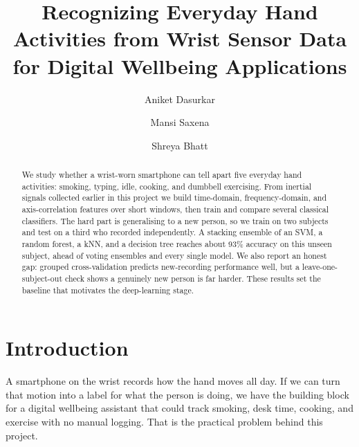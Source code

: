 \documentclass[runningheads]{llncs}
\begin{document}
\title{Recognizing Everyday Hand Activities from Wrist Sensor Data for Digital Wellbeing Applications}


\author{Aniket Dasurkar \and Mansi Saxena \and Shreya Bhatt}

\maketitle

\begin{abstract}
We study whether a wrist-worn smartphone can tell apart five everyday hand activities: smoking, typing, idle, cooking, and dumbbell exercising. From inertial signals collected earlier in this project we build time-domain, frequency-domain, and axis-correlation features over short windows, then train and compare several classical classifiers. The hard part is generalising to a new person, so we train on two subjects and test on a third who recorded independently. A stacking ensemble of an SVM, a random forest, a kNN, and a decision tree reaches about 93\% accuracy on this unseen subject, ahead of voting ensembles and every single model. We also report an honest gap: grouped cross-validation predicts new-recording performance well, but a leave-one-subject-out check shows a genuinely new person is far harder. These results set the baseline that motivates the deep-learning stage.

\end{abstract}


\section{Introduction}
\label{sec:intro}

A smartphone on the wrist records how the hand moves all day. If we can turn that motion into a label for what the person is doing, we have the building block for a digital wellbeing assistant that could track smoking, desk time, cooking, and exercise with no manual logging. That is the practical problem behind this project.
\end{document}

